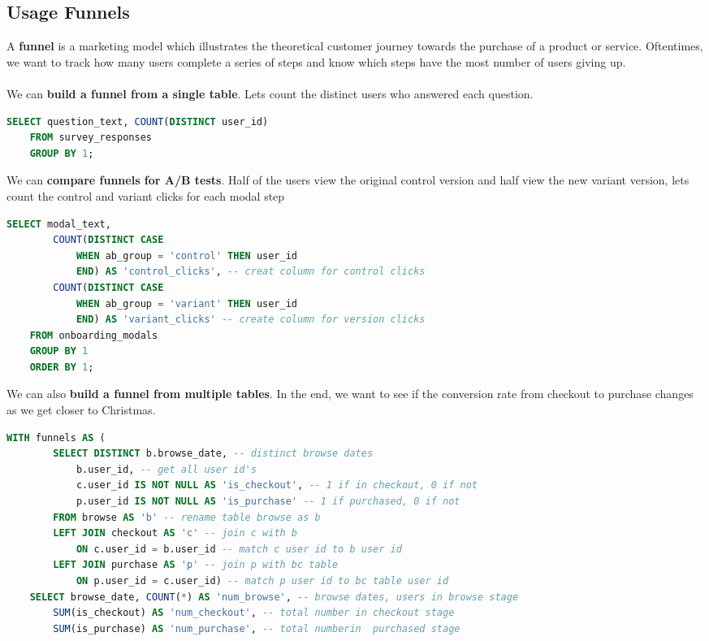 \documentclass[11pt, a4paper]{article}
\begin{document}
\begin{spacing}{1.1}
	\subsection{Usage Funnels}
	A \textbf{funnel} is a marketing model which illustrates the theoretical customer journey towards the purchase of a product or service. Oftentimes, we want to track how many users complete a series of steps and know which steps have the most number of users giving up. \\~\\
	We can \textbf{build a funnel from a single table}. Lets count the distinct users who answered each question.
	\begin{lstlisting}[language=SQL]
	SELECT question_text, COUNT(DISTINCT user_id)
	FROM survey_responses
	GROUP BY 1; \end{lstlisting}\vspace*{1mm}
	We can \textbf{compare funnels for A/B tests}. Half of the users view the original control version and half view the new variant version, lets count the control and variant clicks for each modal step
	\begin{lstlisting}[language=SQL]
	SELECT modal_text, 
		COUNT(DISTINCT CASE
			WHEN ab_group = 'control' THEN user_id
			END) AS 'control_clicks', -- creat column for control clicks
		COUNT(DISTINCT CASE
			WHEN ab_group = 'variant' THEN user_id
			END) AS 'variant_clicks' -- create column for version clicks
	FROM onboarding_modals
	GROUP BY 1
	ORDER BY 1; \end{lstlisting}\vspace*{1mm}
	We can also \textbf{build a funnel from multiple tables}. In the end, we want to see if the conversion rate from checkout to purchase changes as we get closer to Christmas.
	\begin{lstlisting}[language=SQL]
	WITH funnels AS (
		SELECT DISTINCT b.browse_date, -- distinct browse dates
			b.user_id, -- get all user id's
			c.user_id IS NOT NULL AS 'is_checkout', -- 1 if in checkout, 0 if not
			p.user_id IS NOT NULL AS 'is_purchase' -- 1 if purchased, 0 if not
		FROM browse AS 'b' -- rename table browse as b
		LEFT JOIN checkout AS 'c' -- join c with b
			ON c.user_id = b.user_id -- match c user id to b user id
		LEFT JOIN purchase AS 'p' -- join p with bc table
			ON p.user_id = c.user_id) -- match p user id to bc table user id
	SELECT browse_date, COUNT(*) AS 'num_browse', -- browse dates, users in browse stage
		SUM(is_checkout) AS 'num_checkout', -- total number in checkout stage
		SUM(is_purchase) AS 'num_purchase', -- total numberin  purchased stage

\end{lstlisting}
\end{spacing}
\end{document}
